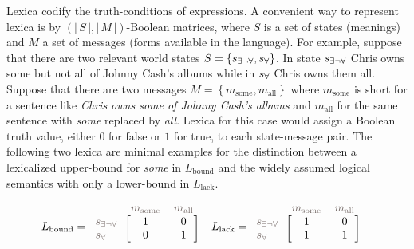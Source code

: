 \documentclass[a4paper, 11pt]{article}
\theoremstyle{Satz}
\newcommand{\set}[1]{\left\{#1\right\}}
\newcommand{\card}[1]{\left \lvert \, #1 \, \right\rvert}
\newcommand{\States}{\ensuremath{S}\xspace}		%
\newcommand{\state}{\ensuremath{s}\xspace}		%
\newcommand{\mystate}[1]{\ensuremath{\state_{\text{#1}}}\xspace} %
\newcommand{\mylang}[1]{\ensuremath{L_{\text{#1}}}\xspace} %
\newcommand{\Messgs}{\ensuremath{M}\xspace}		%
\newcommand{\messg}{\ensuremath{m}\xspace}		%
\newcommand{\mymessg}[1]{\ensuremath{\messg_{\text{#1}}}\xspace} %
\newcommand{\ssome}{\mystate{\ensuremath{\exists\neg\forall}}}
\newcommand{\sall}{\mystate{\ensuremath{\forall}}}
\newcommand{\msome}{\mymessg{some}}
\newcommand{\mall}{\mymessg{all}}
\newcommand{\Lbound}{\mylang{bound}}
\newcommand{\Llack}{\mylang{lack}}
\newcommand{\mygray}[1]{{\textcolor{mygray}{#1}}}
\begin{document}
Lexica codify the truth-conditions of expressions. A convenient way to represent lexica is by
$(\card{\States}, \card{\Messgs})$-Boolean matrices, where $\States$ is a set of states
(meanings) and $M$ a set of messages (forms available in the language). For example, suppose
that there are two relevant world states $\States = \set{\ssome, \sall}$. In state $\ssome$
Chris owns some but not all of Johnny Cash's albums while in $\sall$ Chris owns them
all. Suppose that there are two messages $\Messgs = \set{\msome, \mall}$ where $\msome$ is
short for a sentence like \emph{Chris owns some of Johnny Cash's albums} and $\mall$ for the
same sentence with \emph{some} replaced by \emph{all}.  Lexica for this case would assign a
Boolean truth value, either $0$ for false or $1$ for true, to each state-message pair. The
following two lexica are minimal examples for the distinction between a lexicalized upper-bound
for \emph{some} in $\Lbound$ and the widely assumed logical semantics with only a lower-bound
in $\Llack$.

\begin{align*}
  \Lbound & = \begin{blockarray}{lcc}
    & \mygray{\msome} & \mygray{\mall} \\
    \begin{block}{l[cc]}
      \mygray{\ssome} & 1 & 0 \\
      \mygray{\sall}  & 0 & 1 \\
    \end{block}
  \end{blockarray} &
  \Llack & = \begin{blockarray}{lcc}
    & \mygray{\msome} & \mygray{\mall} \\
    \begin{block}{l[cc]}
      \mygray{\ssome} & 1 & 0 \\
      \mygray{\sall}  & 1 & 1 \\
    \end{block}
  \end{blockarray}
\end{align*}
\end{document}
